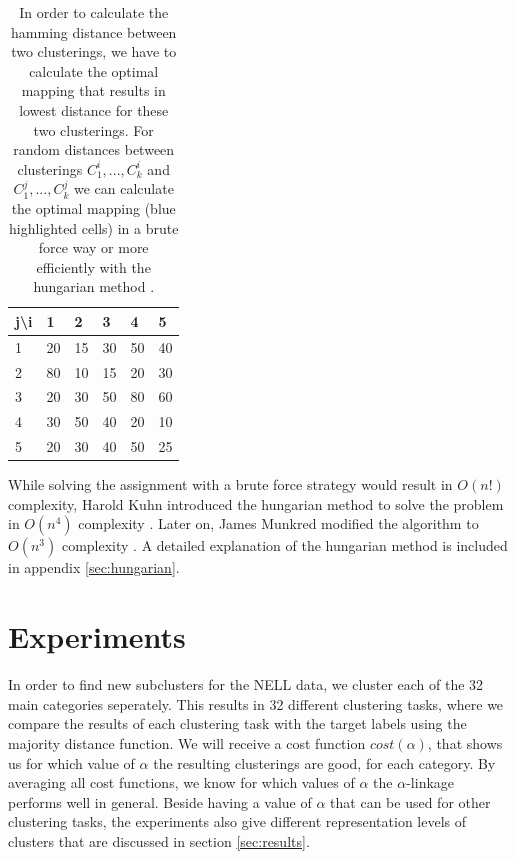 \begin{table}[h]
    \centering
    \begin{tabular}{|l | l l l l l|}
    \hline
    j\textbackslash i & 1 & 2 & 3 & 4 & 5\\ \hline
    1 & 20 & \cellcolor{blue!25}15 & 30 & 50 & 40\\
    2 & 80 & 10 & \cellcolor{blue!25}15 & 20 & 30\\
    3 & \cellcolor{blue!25}20 & 30 & 50 & 80 & 60\\
    4 & 30 & 50 & 40 & \cellcolor{blue!25}20 & 10\\
    5 & 20 & 30 & 40 & 50 & \cellcolor{blue!25}25\\ \hline
    \end{tabular}
    \caption{In order to calculate the hamming distance between two clusterings, we have to calculate the optimal mapping that results in lowest distance for these two clusterings. For random distances between clusterings $C_1^i, ..., C_k^i$ and $C_1^j, ..., C_k^j$ we can calculate the optimal mapping (blue highlighted cells) in a brute force way or more efficiently with the hungarian method \cite{kuhn1955hungarian}\cite{munkres1957algorithms}.}
    \label{table:matching}
\end{table}

While solving the assignment with a brute force strategy would result in $O(n!)$ complexity, Harold Kuhn introduced the hungarian method to solve the problem in $O(n^4)$ complexity \cite{kuhn1955hungarian}. Later on, James Munkred modified the algorithm to $O(n^3)$ complexity \cite{munkres1957algorithms}. A detailed explanation of the hungarian method is included in appendix \ref{sec:hungarian}.

\section{Experiments}

In order to find new subclusters for the NELL data, we cluster each of the 32 main categories seperately. This results in 32 different clustering tasks, where we compare the results of each clustering task with the target labels using the majority distance function. We will receive a cost function $cost(\alpha)$, that shows us for which value of $\alpha$ the resulting clusterings are good, for each category. By averaging all cost functions, we know for which values of $\alpha$ the $\alpha$-linkage performs well in general. Beside having a value of $\alpha$ that can be used for other clustering tasks, the experiments also give different representation levels of clusters that are discussed in section \ref{sec:results}.

